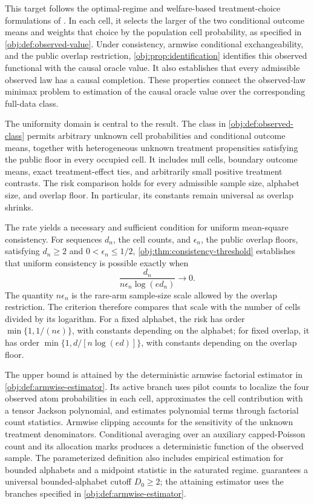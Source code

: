 \documentclass[11pt]{article}
\begin{document}
This target follows the optimal-regime and welfare-based treatment-choice formulations of \citet{Murphy2003,Manski2004}. In each cell, it selects the larger of the two conditional outcome means and weights that choice by the population cell probability, as specified in \cref{obj:def:observed-value}. Under consistency, armwise conditional exchangeability, and the public overlap restriction, \cref{obj:prop:identification} identifies this observed functional with the causal oracle value. It also establishes that every admissible observed law has a causal completion. These properties connect the observed-law minimax problem to estimation of the causal oracle value over the corresponding full-data class.

The uniformity domain is central to the result. The class in \cref{obj:def:observed-class} permits arbitrary unknown cell probabilities and conditional outcome means, together with heterogeneous unknown treatment propensities satisfying the public floor in every occupied cell. It includes null cells, boundary outcome means, exact treatment-effect ties, and arbitrarily small positive treatment contrasts. The risk comparison holds for every admissible sample size, alphabet size, and overlap floor. In particular, its constants remain universal as overlap shrinks.

The rate yields a necessary and sufficient condition for uniform mean-square consistency. For sequences \(d_n\), the cell counts, and \(\epsilon_n\), the public overlap floors, satisfying \(d_n\ge2\) and \(0<\epsilon_n\le1/2\), \cref{obj:thm:consistency-threshold} establishes that uniform consistency is possible exactly when
\[
\frac{d_n}{n\epsilon_n\log(e d_n)}\longrightarrow0.
\]
The quantity \(n\epsilon_n\) is the rare-arm sample-size scale allowed by the overlap restriction. The criterion therefore compares that scale with the number of cells divided by its logarithm. For a fixed alphabet, the risk has order \(\min\{1,1/(n\epsilon)\}\), with constants depending on the alphabet; for fixed overlap, it has order \(\min\{1,d/[n\log(ed)]\}\), with constants depending on the overlap floor.

The upper bound is attained by the deterministic armwise factorial estimator in \cref{obj:def:armwise-estimator}. Its active branch uses pilot counts to localize the four observed atom probabilities in each cell, approximates the cell contribution with a tensor Jackson polynomial, and estimates polynomial terms through factorial count statistics. Armwise clipping accounts for the sensitivity of the unknown treatment denominators. Conditional averaging over an auxiliary capped-Poisson count and its allocation marks produces a deterministic function of the observed sample. The parameterized definition also includes empirical estimation for bounded alphabets and a midpoint statistic in the saturated regime.  guarantees a universal bounded-alphabet cutoff \(D_0\ge2\); the attaining estimator uses the branches specified in \cref{obj:def:armwise-estimator}.
\end{document}
